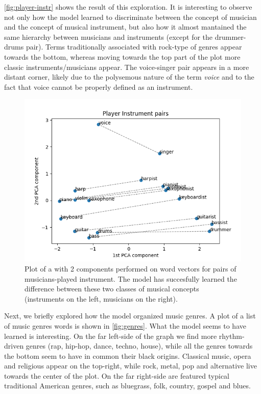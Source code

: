 \autoref{fig:player-instr} shows the result of this exploration. It is interesting to observe not only how the model learned to discriminate between the concept of musician and the concept of musical instrument, but also how it almost mantained the same hierarchy between musicians and instruments (except for the drummer-drums pair). Terms traditionally associated with rock-type of genres appear towards the bottom, whereas moving towards the top part of the plot more classic instruments/musicians appear. The voice-singer pair appears in a more distant corner, likely due to the polysemous nature of the term \emph{voice} and to the fact that voice cannot be properly defined as an instrument.

\begin{figure}[bth]
	\myfloatalign
	\includegraphics[width=\linewidth]{gfx/player-instrument2}
	\caption[ plot of player-instrument word pairs]{Plot of a  with 2 components performed on word vectors for pairs of musicians-played instrument. The model has succesfully learned the difference between these two classes of musical concepts (instruments on the left, musicians on the right).}
	\label{fig:player-instr}
\end{figure}

Next, we briefly explored how the model organized music genres. A  plot of a list of music genres words is shown in \autoref{fig:genres}. What the model seems to have learned is interesting. On the far left-side of the graph we find more rhythm-driven genres (rap, hip-hop, dance, techno, house), while all the genres towards the bottom seem to have in common their black origins. Classical music, opera and religious appear on the top-right, while rock, metal, pop and alternative live towards the center of the plot. On the far right-side are featured typical traditional American genres, such as bluegrass, folk, country, gospel and blues.

